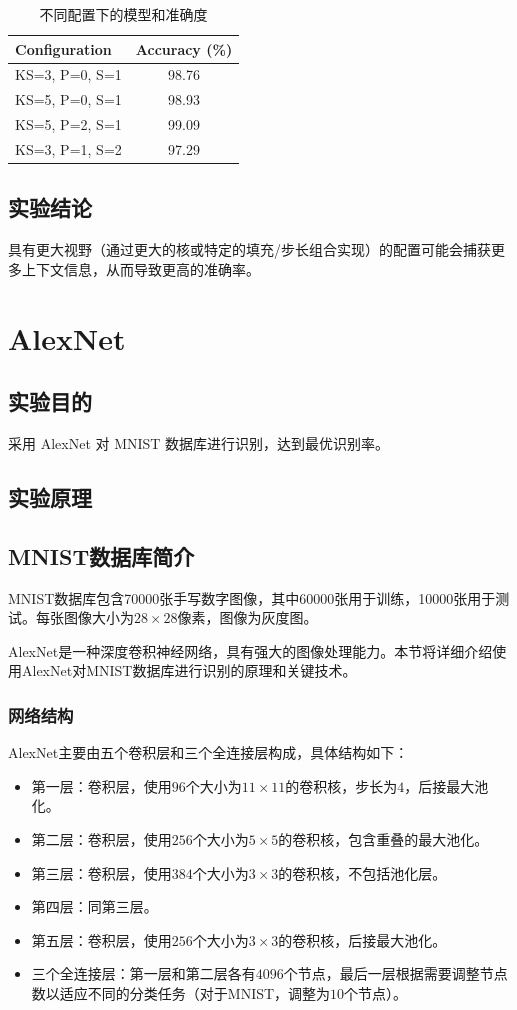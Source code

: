 \documentclass[a4paper,12pt]{article}
\begin{document}
\begin{table}[htbp]
	\centering
	\caption{不同配置下的模型和准确度}
	\begin{tabular}{@{}lc@{}}
		\toprule
		Configuration     & Accuracy (\%) \\ \midrule
		KS=3, P=0, S=1    & 98.76         \\
		KS=5, P=0, S=1    & 98.93         \\
		KS=5, P=2, S=1    & 99.09         \\
		KS=3, P=1, S=2    & 97.29         \\ \bottomrule
	\end{tabular}
\end{table}


\subsection{实验结论}
具有更大视野（通过更大的核或特定的填充/步长组合实现）的配置可能会捕获更多上下文信息，从而导致更高的准确率。


\newpage
\section{AlexNet}
\subsection{实验目的}
采用 AlexNet 对 MNIST 数据库进行识别，达到最优识别率。
\subsection{实验原理}
\subsection*{MNIST数据库简介}
MNIST数据库包含70000张手写数字图像，其中60000张用于训练，10000张用于测试。每张图像大小为$28 \times 28$像素，图像为灰度图。

AlexNet是一种深度卷积神经网络，具有强大的图像处理能力。本节将详细介绍使用AlexNet对MNIST数据库进行识别的原理和关键技术。

\subsubsection{网络结构}
AlexNet主要由五个卷积层和三个全连接层构成，具体结构如下：
\begin{itemize}
	\item 第一层：卷积层，使用$96$个大小为$11 \times 11$的卷积核，步长为$4$，后接最大池化。
	\item 第二层：卷积层，使用$256$个大小为$5 \times 5$的卷积核，包含重叠的最大池化。
	\item 第三层：卷积层，使用$384$个大小为$3 \times 3$的卷积核，不包括池化层。
	\item 第四层：同第三层。
	\item 第五层：卷积层，使用$256$个大小为$3 \times 3$的卷积核，后接最大池化。
	\item 三个全连接层：第一层和第二层各有$4096$个节点，最后一层根据需要调整节点数以适应不同的分类任务（对于MNIST，调整为$10$个节点）。
\end{itemize}
\end{document}
